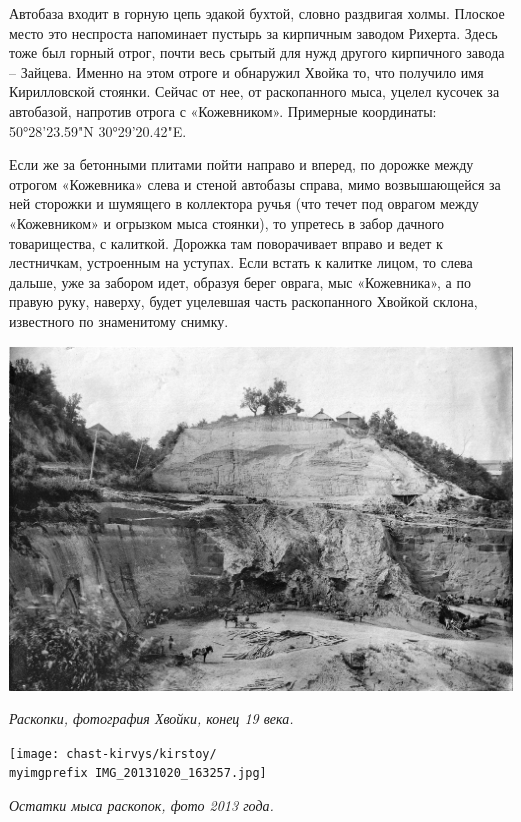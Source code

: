 Автобаза входит в горную цепь эдакой бухтой, словно раздвигая холмы. Плоское место это неспроста напоминает пустырь за кирпичным заводом Рихерта. Здесь тоже был горный отрог, почти весь срытый для нужд другого кирпичного завода – Зайцева. Именно на этом отроге и обнаружил Хвойка то, что получило имя Кирилловской стоянки. Сейчас от нее, от раскопанного мыса, уцелел кусочек за автобазой, напротив отрога с «Кожевником». Примерные координаты: 50°28'23.59"N 30°29'20.42"E.

Если же за бетонными плитами пойти направо и вперед, по дорожке между отрогом «Кожевника» слева и стеной автобазы справа, мимо возвышающейся за ней сторожки и шумящего в коллектора ручья (что течет под оврагом между «Кожевником» и огрызком мыса стоянки), то упретесь в забор дачного товарищества, с калиткой. Дорожка там поворачивает вправо и ведет к лестничкам, устроенным на уступах. Если встать к калитке лицом, то слева дальше, уже за забором идет, образуя берег оврага, мыс «Кожевника», а по правую руку, наверху, будет уцелевшая часть раскопанного Хвойкой склона, известного по знаменитому снимку.

\begin{center}
\includegraphics[width=\linewidth]{chast-kirvys/kirstoy/kirst-02.jpg}

\textit{Раскопки, фотография Хвойки, конец 19 века.}
\end{center}

\newpage

\begin{center}
\texttt{[image: chast-kirvys/kirstoy/\\myimgprefix IMG\_20131020\_163257.jpg]}

\textit{Остатки мыса раскопок, фото 2013 года.}
\end{center}

